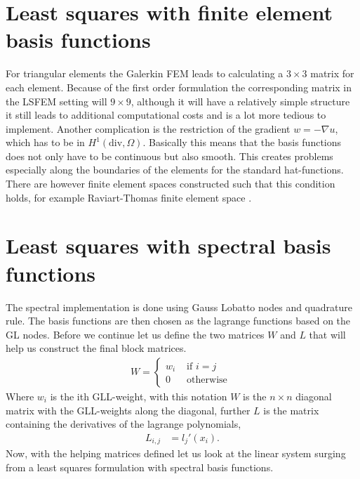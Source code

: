 \section{Least squares with finite element basis functions}
For triangular elements the Galerkin FEM leads to calculating a $3\times 3$ matrix for each element. Because of the first order formulation the corresponding matrix in the LSFEM setting will $9 \times 9$, although it will have a relatively simple structure it still leads to additional computational costs and is a lot more tedious to implement. Another complication is the restriction of the gradient $w = -\nabla u$, which has to be in $H^1(\text{div},\Omega) $. Basically this means that the basis functions does not only have to be continuous but also smooth. This creates problems especially along the boundaries of the elements for the standard hat-functions. There are however finite element spaces constructed such that this condition holds, for example Raviart-Thomas finite element space \cite{arnold1985mixed}. 

\section{Least squares with spectral basis functions}

The spectral implementation is done using Gauss Lobatto nodes and quadrature rule. The basis functions are then chosen as the lagrange functions based on the GL nodes. Before we continue let us define the two matrices $W$ and $L$ that will help us construct the final block matrices.
%
\begin{align}
	W = \left\{
		\begin{array}{lr}
			w_i & \text{ if } i = j \\
			0 & \text{ otherwise }
		\end{array}
		\right.
	\label{eq:Wdef}
\end{align}
%
Where $w_i$ is the ith GLL-weight, with this notation $W$ is the $n \times n$ diagonal matrix with the GLL-weights along the diagonal, further $L$ is the matrix containing the derivatives of the lagrange polynomials,  
%
\begin{align}
	L_{i,j} &= l_j'(x_i).
	\label{eq:HelpMatrices}
\end{align}
%
Now, with the helping matrices defined let us look at the linear system surging from a least squares formulation with spectral basis functions. 

